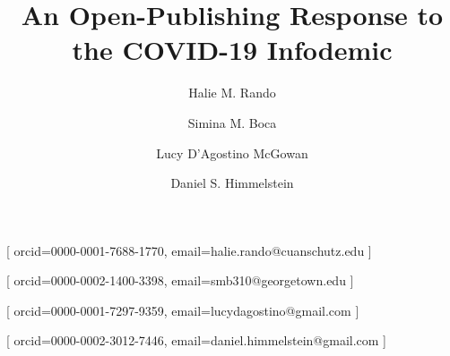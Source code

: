 \documentclass[twocolumn]{ceurart}
\begin{document}



\title{An Open-Publishing Response to the COVID-19 Infodemic}

  \author[]{Halie M. Rando}[%
			orcid=0000-0001-7688-1770,
				email=halie.rando@cuanschutz.edu
	]
			\address[]{
							University of Colorado School of Medicine,
										Center for Health AI,
										Aurora,
										CO,
										USA
					}
			\address[]{
							University of Colorado School of Medicine,
										Department of Biochemistry and Molecular Genetics,
										Aurora,
										CO,
										USA
					}
			\address[]{
							University of Pennsylvania,
										Perelman School of Medicine, Department of Systems Pharmacology and Translational Therapeutics,
										Philadelphia,
										PA,
										USA
					}
	  \author[]{Simina M. Boca}[%
			orcid=0000-0002-1400-3398,
				email=smb310@georgetown.edu
	]
			\address[]{
							Georgetown University Medical Center,
										Innovation Center for Biomedical Informatics,
										Washington,
										DC,
										USA
					}
	  \author[]{Lucy D'Agostino McGowan}[%
			orcid=0000-0001-7297-9359,
				email=lucydagostino@gmail.com
	]
			\address[]{
							Wake Forest University,
										Department of Mathematics and Statistics,
										Winston-Salem,
										NC,
										USA
					}
	  \author[]{Daniel S. Himmelstein}[%
			orcid=0000-0002-3012-7446,
				email=daniel.himmelstein@gmail.com
	]
			\address[]{
							Related Sciences,
																	}
			\address[]{
							University of Pennsylvania,
										Perelman School of Medicine, Department of Systems Pharmacology and Translational Therapeutics,
										Philadelphia,
										PA,
										USA
					}
\end{document}

